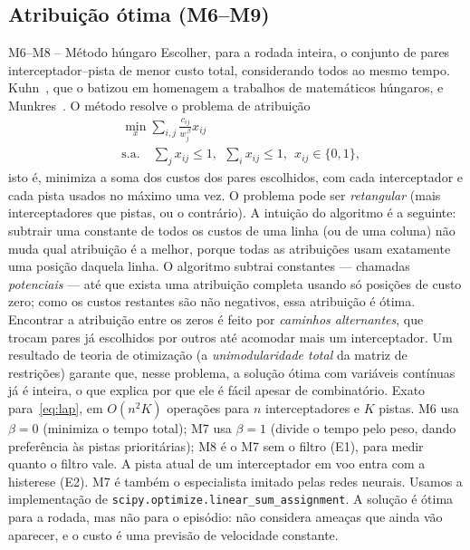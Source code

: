\subsection{Atribuição ótima (M6--M9)}\label{sec:met_atrib}

\begin{metodo}{M6--M8 -- Método húngaro}
\ideia Escolher, para a rodada inteira, o conjunto de pares interceptador--pista de menor custo total, considerando todos
ao mesmo tempo.
\orig Kuhn~\cite{kuhn1955}, que o batizou em homenagem a trabalhos de matemáticos húngaros, e Munkres~\cite{munkres1957}.
\func O método resolve o problema de atribuição
\begin{equation}
  \begin{aligned}
  &\min_{x}\sum_{i,j}\frac{c_{ij}}{w_j^{\,\beta}}x_{ij}\\
  &\text{s.a.}\quad\sum_j x_{ij}\le1,\ \ \sum_i x_{ij}\le1,\ \ x_{ij}\in\{0,1\},
  \end{aligned}
  \label{eq:lap}
\end{equation}
isto é, minimiza a soma dos custos dos pares escolhidos, com cada interceptador e cada pista usados no máximo uma vez. O
problema pode ser \emph{retangular} (mais interceptadores que pistas, ou o contrário). A intuição do algoritmo é a
seguinte: subtrair uma constante de todos os custos de uma linha (ou de uma coluna) não muda qual atribuição é a melhor,
porque todas as atribuições usam exatamente uma posição daquela linha. O algoritmo subtrai constantes --- chamadas
\emph{potenciais} --- até que exista uma atribuição completa usando só posições de custo zero; como os custos restantes
são não negativos, essa atribuição é ótima. Encontrar a atribuição entre os zeros é feito por \emph{caminhos
alternantes}, que trocam pares já escolhidos por outros até acomodar mais um interceptador. Um resultado de teoria de
otimização (a \emph{unimodularidade total} da matriz de restrições) garante que, nesse problema, a solução ótima com
variáveis contínuas já é inteira, o que explica por que ele é fácil apesar de combinatório.
\prop Exato para~\eqref{eq:lap}, em $O(n^2K)$ operações para $n$ interceptadores e $K$ pistas.
\adap M6 usa $\beta=0$ (minimiza o tempo total); M7 usa $\beta=1$ (divide o tempo pelo peso, dando preferência às pistas
prioritárias); M8 é o M7 sem o filtro (E1), para medir quanto o filtro vale. A pista atual de um interceptador em voo entra
com a histerese (E2). M7 é também o especialista imitado pelas redes neurais. Usamos a implementação de
\texttt{scipy.optimize.linear\_sum\_assignment}.
\espera A solução é ótima para a rodada, mas não para o episódio: não considera ameaças que ainda vão aparecer, e o custo é
uma previsão de velocidade constante.
\end{metodo}

